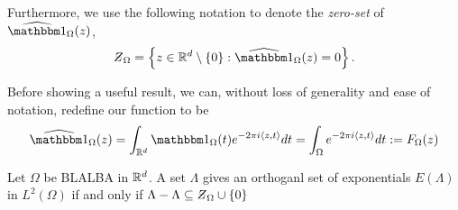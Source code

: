 \documentclass[../thesis.tex]{subfiles}
\begin{document}
Furthermore, we use the following notation to denote the \emph{zero-set} of $\indicatorFourier{\Omega}{z}$,
\begin{equation*}
    \Zstroke_{\Omega} = \braqMed{ z \in \R^d \setminus \braqMed{0} : \indicatorFourier{\Omega}{z} = 0}.
\end{equation*}

Before showing a useful result, we can, without loss of generality and ease of notation, redefine our function to be
\begin{equation*}
    \indicatorFourier{\Omega}{z} = \int_{\R^d} \indicator{\Omega}{t}  e^{-2\pi i \braa{z,t}} dt = \int_{\Omega} e^{-2\pi i \braa{z,t}} dt := F_{\Omega}(z)
\end{equation*}

\begin{lemma}
    Let $\Omega$ be BLALBA in $\mathbb{R}^d$. A set $\Lambda$ gives an orthoganl set of exponentials $E(\Lambda)$ in $L^2(\Omega)$ if and only if
    $\Lambda - \Lambda \subseteq \Zstroke_{\Omega} \cup \braq{0}$


\end{lemma}
\end{document}
